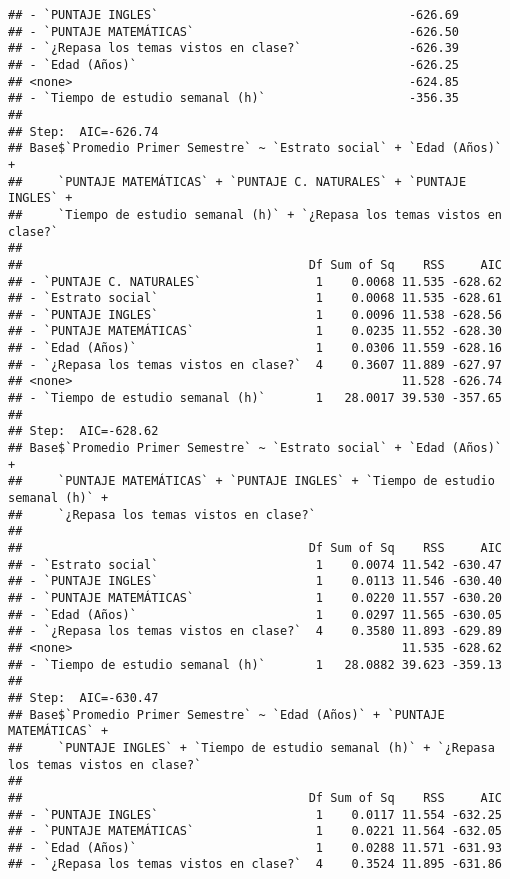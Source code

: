 \documentclass[
  man]{apa6}
\begin{document}
\begin{verbatim}
## - `PUNTAJE INGLES`                                   -626.69
## - `PUNTAJE MATEMÁTICAS`                              -626.50
## - `¿Repasa los temas vistos en clase?`               -626.39
## - `Edad (Años)`                                      -626.25
## <none>                                               -624.85
## - `Tiempo de estudio semanal (h)`                    -356.35
## 
## Step:  AIC=-626.74
## Base$`Promedio Primer Semestre` ~ `Estrato social` + `Edad (Años)` + 
##     `PUNTAJE MATEMÁTICAS` + `PUNTAJE C. NATURALES` + `PUNTAJE INGLES` + 
##     `Tiempo de estudio semanal (h)` + `¿Repasa los temas vistos en clase?`
## 
##                                        Df Sum of Sq    RSS     AIC
## - `PUNTAJE C. NATURALES`                1    0.0068 11.535 -628.62
## - `Estrato social`                      1    0.0068 11.535 -628.61
## - `PUNTAJE INGLES`                      1    0.0096 11.538 -628.56
## - `PUNTAJE MATEMÁTICAS`                 1    0.0235 11.552 -628.30
## - `Edad (Años)`                         1    0.0306 11.559 -628.16
## - `¿Repasa los temas vistos en clase?`  4    0.3607 11.889 -627.97
## <none>                                              11.528 -626.74
## - `Tiempo de estudio semanal (h)`       1   28.0017 39.530 -357.65
## 
## Step:  AIC=-628.62
## Base$`Promedio Primer Semestre` ~ `Estrato social` + `Edad (Años)` + 
##     `PUNTAJE MATEMÁTICAS` + `PUNTAJE INGLES` + `Tiempo de estudio semanal (h)` + 
##     `¿Repasa los temas vistos en clase?`
## 
##                                        Df Sum of Sq    RSS     AIC
## - `Estrato social`                      1    0.0074 11.542 -630.47
## - `PUNTAJE INGLES`                      1    0.0113 11.546 -630.40
## - `PUNTAJE MATEMÁTICAS`                 1    0.0220 11.557 -630.20
## - `Edad (Años)`                         1    0.0297 11.565 -630.05
## - `¿Repasa los temas vistos en clase?`  4    0.3580 11.893 -629.89
## <none>                                              11.535 -628.62
## - `Tiempo de estudio semanal (h)`       1   28.0882 39.623 -359.13
## 
## Step:  AIC=-630.47
## Base$`Promedio Primer Semestre` ~ `Edad (Años)` + `PUNTAJE MATEMÁTICAS` + 
##     `PUNTAJE INGLES` + `Tiempo de estudio semanal (h)` + `¿Repasa los temas vistos en clase?`
## 
##                                        Df Sum of Sq    RSS     AIC
## - `PUNTAJE INGLES`                      1    0.0117 11.554 -632.25
## - `PUNTAJE MATEMÁTICAS`                 1    0.0221 11.564 -632.05
## - `Edad (Años)`                         1    0.0288 11.571 -631.93
## - `¿Repasa los temas vistos en clase?`  4    0.3524 11.895 -631.86

\end{verbatim}
\end{document}
